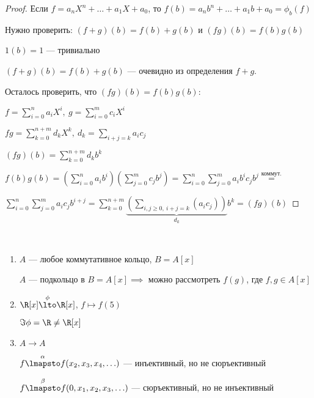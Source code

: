 \begin{proof}

    Если $f = a_n X^n + \ldots + a_1 X + a_0$, то $f(b) = a_n b^n + \ldots + a_1 b + a_0 = \phi_b(f)$

    Нужно проверить: $(f + g)(b) = f(b) + g(b)$ и $(fg)(b) = f(b)g(b)$

    $1(b) = 1$ --- тривиально

    $(f + g)(b) = f(b) + g(b)$ --- очевидно из определения $f + g$.

    Осталось проверить, что $(fg)(b) = f(b)g(b)$:

    $f = \sum\limits_{i = 0}^n a_i X^i,~ g = \sum\limits_{i = 0}^m c_i X^i$

    $fg = \sum\limits_{k = 0}^{n + m} d_k X^k,~ d_k = \sum\limits_{i + j = k} a_i c_j$

    $(fg)(b) = \sum\limits_{k=0}^{n + m} d_k b^k$

    $f(b) g(b) = \left( \sum\limits_{i = 0}^n a_i b^i \right) \left( \sum\limits_{j = 0}^m c_j b^j \right) = \sum\limits_{i = 0}^n \sum\limits_{j = 0}^m a_i b^i c_j b^j \overset{\text{коммут.}}{=}$ 
    
    $\sum\limits_{i = 0}^n \sum\limits_{j = 0}^m a_i c_j b^{i + j} = \sum\limits_{k = 0}^{n + m} \underbrace{\left( \sum\limits_{i, j \geq 0,~ i + j = k} (a_i c_j) \right)}_{d_k} b^k = (fg)(b)$
\end{proof}

\begin{examples}~

    \begin{enumerate}
        \item 
        $A$ --- любое коммутативное кольцо, $B = A[x]$
        
        $A$ --- подкольцо в $B = A[x] \implies$ можно рассмотреть $f(g)$, где $f, g \in A[x]$

        \item $\R[x] \overset{\phi}{\lto} \R[x]$, $f \mapsto f(5)$
        
        $\Im \phi = \R \neq \R[x]$

        \item $A \to A$
        
        $f \overset{\alpha}{\lmapsto} f(x_2, x_3, x_4, \ldots)$ --- инъективный, но не сюръективный 

        $f \overset{\beta}{\lmapsto} f(0, x_1, x_2, x_3, \ldots)$ --- сюръективный, но не инъективный
    \end{enumerate}

\end{examples}

